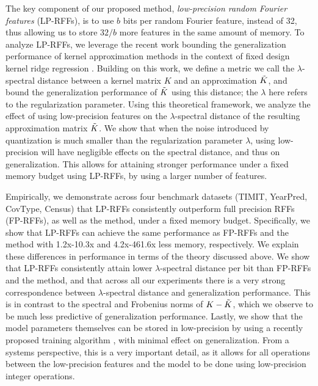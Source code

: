 
The key component of our proposed method, \textit{low-precision random Fourier features} (LP-RFFs), is to use $b$ bits per random Fourier feature, instead of 32, thus allowing us to store $32/b$ more features in the same amount of memory. To analyze LP-RFFs, we leverage the recent work bounding the generalization performance of kernel approximation methods in the context of fixed design kernel ridge regression \citep{avron17,musco17}. Building on this work, we define a metric we call the $\lambda$-spectral distance between a kernel matrix $K$ and an approximation $\tilde{K}$, and bound the generalization performance of $\tilde{K}$ using this distance; the $\lambda$ here refers to the regularization parameter. Using this theoretical framework, we analyze the effect of using low-precision features on the $\lambda$-spectral distance of the resulting approximation matrix $\tilde{K}$. We show that when the noise introduced by quantization is much smaller than the regularization parameter $\lambda$, using low-precision will have negligible effects on the spectral distance, and thus on generalization.  This allows for attaining stronger performance under a fixed memory budget using LP-RFFs, by using a larger number of features.

Empirically, we demonstrate across four benchmark datasets (TIMIT, YearPred, CovType, Census) that LP-RFFs consistently outperform full precision RFFs (FP-RFFs), as well as the \Nystrom method, under a fixed memory budget. Specifically, we show that LP-RFFs can achieve the same performance as FP-RFFs and the \Nystrom method with 1.2x-10.3x and 4.2x-461.6x less memory, respectively. We explain these differences in performance in terms of the theory discussed above. We show that LP-RFFs consistently attain lower $\lambda$-spectral distance per bit than FP-RFFs and the \Nystrom method, and that across all our experiments there is a very strong correspondence between $\lambda$-spectral distance and generalization performance. This is in contrast to the spectral and Frobenius norms of $K-\tilde{K}$, which we observe to be much less predictive of generalization performance.  Lastly, we show that the model parameters themselves can be stored in low-precision by using a recently proposed training algorithm \citep{halp18}, with minimal effect on generalization. From a systems perspective, this is a very important detail, as it allows for all operations between the low-precision features and the model to be done using low-precision integer operations.

